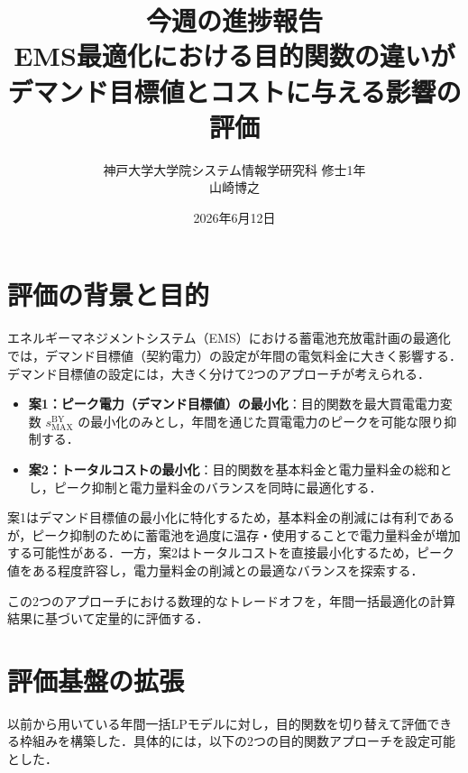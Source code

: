 \documentclass[a4paper,11pt,dvipdfmx]{jsarticle}
\title{今週の進捗報告\\[0.5em]\large EMS最適化における目的関数の違いが\\デマンド目標値とコストに与える影響の評価}
\author{神戸大学大学院システム情報学研究科 修士1年\\山崎博之}
\date{2026年6月12日}
\begin{document}
\maketitle

\section{評価の背景と目的}
エネルギーマネジメントシステム（EMS）における蓄電池充放電計画の最適化では，デマンド目標値（契約電力）の設定が年間の電気料金に大きく影響する．デマンド目標値の設定には，大きく分けて2つのアプローチが考えられる．

\begin{itemize}
    \item \textbf{案1：ピーク電力（デマンド目標値）の最小化}：目的関数を最大買電電力変数 $s^{\mathrm{BY}}_{\mathrm{MAX}}$ の最小化のみとし，年間を通じた買電電力のピークを可能な限り抑制する．
    \item \textbf{案2：トータルコストの最小化}：目的関数を基本料金と電力量料金の総和とし，ピーク抑制と電力量料金のバランスを同時に最適化する．
\end{itemize}

案1はデマンド目標値の最小化に特化するため，基本料金の削減には有利であるが，ピーク抑制のために蓄電池を過度に温存・使用することで電力量料金が増加する可能性がある．一方，案2はトータルコストを直接最小化するため，ピーク値をある程度許容し，電力量料金の削減との最適なバランスを探索する．

この2つのアプローチにおける数理的なトレードオフを，年間一括最適化の計算結果に基づいて定量的に評価する．

\section{評価基盤の拡張}
以前から用いている年間一括LPモデルに対し，目的関数を切り替えて評価できる枠組みを構築した．具体的には，以下の2つの目的関数アプローチを設定可能とした．
\end{document}
